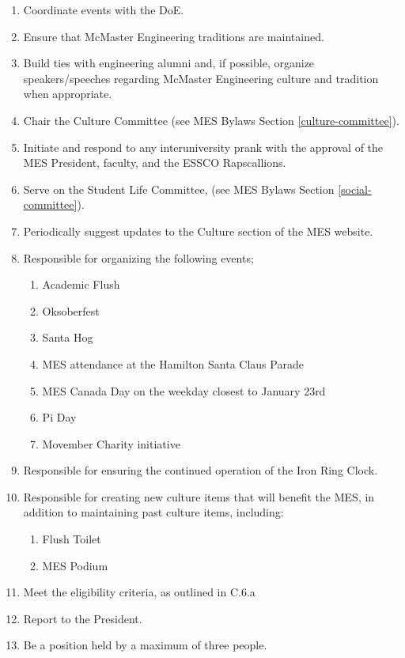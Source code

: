 \begin{enumerate}
 \item
  Coordinate events with the DoE.
 \item
  Ensure that McMaster Engineering traditions are maintained.
 \item
  Build ties with engineering alumni and, if possible, organize speakers/speeches regarding McMaster Engineering culture and tradition when appropriate.
 \item
  Chair the Culture Committee (see MES Bylaws Section \ref{culture-committee}).
 \item
  Initiate and respond to any interuniversity prank with the approval of the MES President, faculty, and the ESSCO Rapscallions.
 \item
  Serve on the Student Life Committee, (see MES Bylaws Section \ref{social-committee}).
 \item
  Periodically suggest updates to the Culture section of the MES website.
 \item
  Responsible for organizing the following events;

  \begin{enumerate}
   \item
    Academic Flush
   \item 
    Oksoberfest
   \item
    Santa Hog
   \item
    MES attendance at the Hamilton Santa Claus Parade
   \item
    MES Canada Day on the weekday closest to January 23rd
   \item
    Pi Day
   \item
    Movember Charity initiative
  \end{enumerate}
 \item
  Responsible for ensuring the continued operation of the Iron Ring Clock.
 \item
  Responsible for creating new culture items that will benefit the MES, in addition to maintaining past culture items, including:

  \begin{enumerate}
   \item
    Flush Toilet
   \item
    MES Podium
  \end{enumerate}
 \item
  Meet the eligibility criteria, as outlined in C.6.a %
 \item
  Report to the President.
 \item
  Be a position held by a maximum of three people.

\end{enumerate}

